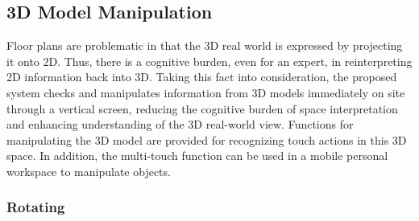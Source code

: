 \subsection{3D Model Manipulation}



Floor plans are problematic in that the 3D real world is expressed by projecting it onto 2D. Thus, there is a cognitive burden, even for an expert, in reinterpreting 2D information back into 3D. Taking this fact into consideration, the proposed system checks and manipulates information from 3D models immediately on site through a vertical screen, reducing the cognitive burden of space interpretation and enhancing understanding of the 3D real-world view. Functions for manipulating the 3D model are provided for recognizing touch actions in this 3D space. In addition, the multi-touch function can be used in a mobile personal workspace to manipulate objects. 

\subsubsection{Rotating}

